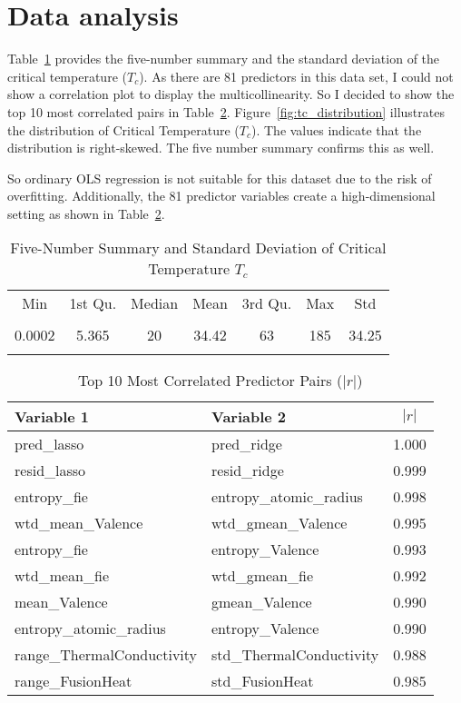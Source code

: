 \documentclass[conference]{IEEEtran}
\begin{document}
\section {Data analysis}

Table~\ref{tab:summary} provides the five-number summary and the standard deviation 
of the critical temperature ($T_c$). As there are 81 predictors in this data set, I could not show a correlation plot to display the multicollinearity.
So I decided to show the top 10 most correlated pairs in Table~\ref{tab:top_corr}.
Figure~\ref{fig:tc_distribution} illustrates the distribution of Critical Temperature ($T_c$). The values indicate that the distribution is 
right-skewed. The five number summary confirms this as well.

So ordinary OLS regression is not suitable for this dataset due to the risk of overfitting.
Additionally, the 81 predictor variables create a high-dimensional setting as shown in Table~\ref{tab:top_corr}.

\begin{table}[h]
\centering
\caption{Five-Number Summary and Standard Deviation of Critical Temperature $T_c$ }
\label{tab:summary}
\begin{tabular}{ccccccc}
\toprule
Min & 1st Qu. & Median & Mean & 3rd Qu. & Max & Std \\\\
\midrule
0.0002 & 5.365 & 20 & 34.42 & 63 & 185 & 34.25 \\\\
\bottomrule
\end{tabular}
\end{table}

\begin{table}[htbp]
\centering
\caption{Top 10 Most Correlated Predictor Pairs ($|r|$)}
\label{tab:top_corr}
\begin{tabular}{l l c}
\toprule
Variable 1 & Variable 2 & $|r|$ \\
\midrule
pred\_lasso & pred\_ridge & 1.000 \\
resid\_lasso & resid\_ridge & 0.999 \\
entropy\_fie & entropy\_atomic\_radius & 0.998 \\
wtd\_mean\_Valence & wtd\_gmean\_Valence & 0.995 \\
entropy\_fie & entropy\_Valence & 0.993 \\
wtd\_mean\_fie & wtd\_gmean\_fie & 0.992 \\
mean\_Valence & gmean\_Valence & 0.990 \\
entropy\_atomic\_radius & entropy\_Valence & 0.990 \\
range\_ThermalConductivity & std\_ThermalConductivity & 0.988 \\
range\_FusionHeat & std\_FusionHeat & 0.985 \\
\bottomrule
\end{tabular}
\end{table}
\end{document}
